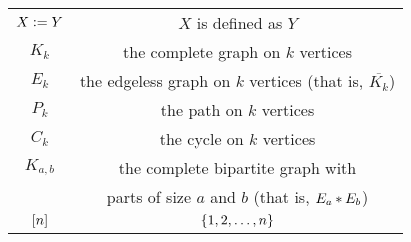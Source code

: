 \begin{center}
\begin{longtable}{c|c}
	 $X \mathrel{\mathop:}= Y$ & $X$ is defined as $Y$ \\
    $K_k$ & the complete graph on $k$ vertices \\
    $E_k$ & the edgeless graph on $k$ vertices (that is, $\overline{K_k}$) \\
	 $P_k$ & the path on $k$ vertices \\
	 $C_k$ & the cycle on $k$ vertices \\
    $K_{a,b}$ & the complete bipartite graph with \\
              & parts of size $a$ and $b$ (that is, $E_a \mbox{\hspace{2 pt}$\ast$\hspace{2 pt}} E_b$) \\
	 $\left[n\right]$ & $\left\{ 1, 2, \ldots, n \right\}$ \\
  \end{longtable}
\end{center}

